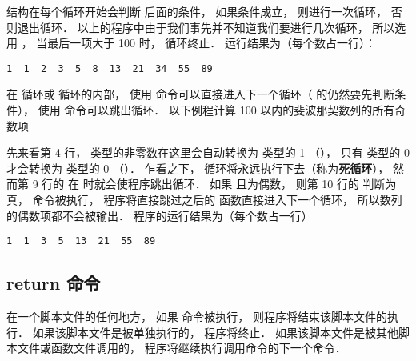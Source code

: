  结构在每个循环开始会判断  后面的条件， 如果条件成立， 则进行一次循环， 否则退出循环． 以上的程序中由于我们事先并不知道我们要进行几次循环， 所以选用 ， 当最后一项大于 100 时， 循环终止． 运行结果为（每个数占一行）：
\begin{lstlisting}[language=MatlabCom]
1  1  2  3  5  8  13  21  34  55  89
\end{lstlisting}

在  循环或  循环的内部， 使用  命令可以直接进入下一个循环（ 的仍然要先判断条件）， 使用  命令可以跳出循环． 以下例程计算 100 以内的斐波那契数列的所有奇数项


先来看第 4 行，  类型的非零数在这里会自动转换为  类型的 1 （）， 只有  类型的 0 才会转换为  类型的 0 （）． 乍看之下，  循环将永远执行下去（称为\textbf{死循环}）， 然而第 9 行的  在  时就会使程序跳出循环． 如果  且为偶数， 则第 10 行的  判断为真，  命令被执行， 程序将直接跳过之后的  函数直接进入下一个循环， 所以数列的偶数项都不会被输出． 程序的运行结果为（每个数占一行）
\begin{lstlisting}[language=MatlabCom]
1  1  3  5  13  21  55  89
\end{lstlisting}

\subsection{return 命令}
在一个脚本文件的任何地方， 如果  命令被执行， 则程序将结束该脚本文件的执行． 如果该脚本文件是被单独执行的， 程序将终止． 如果该脚本文件是被其他脚本文件或函数文件调用的， 程序将继续执行调用命令的下一个命令．



